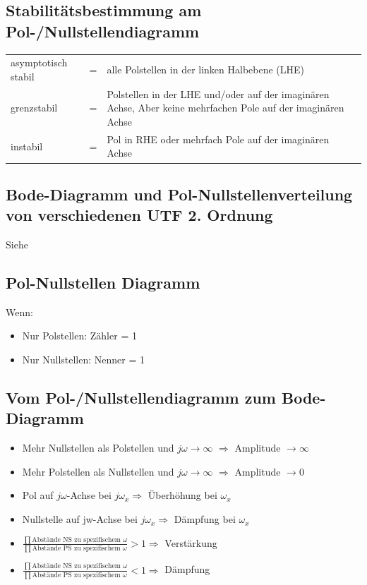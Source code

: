 \subsection{Stabilitätsbestimmung am Pol-/Nullstellendiagramm}
\begin{tabular}{lcp{13cm}}
	asymptotisch stabil & = & alle Polstellen in der linken Halbebene (LHE) \\
	grenzstabil & = & Polstellen in der LHE und/oder auf der imaginären 
  Achse, Aber keine mehrfachen Pole auf der imaginären Achse \\
  instabil & = & Pol in RHE oder mehrfach Pole auf der imaginären Achse
\end{tabular}

\subsection{Bode-Diagramm und Pol-Nullstellenverteilung von verschiedenen UTF
2. Ordnung}
Siehe   

\subsection{Pol-Nullstellen Diagramm}
Wenn:
\begin{itemize}
\item Nur Polstellen:  Zähler = 1
\item Nur Nullstellen: Nenner = 1
\end{itemize}

\subsection{Vom Pol-/Nullstellendiagramm zum Bode-Diagramm}
\begin{itemize}
  \item Mehr Nullstellen als Polstellen und $j \omega \rightarrow\infty$
  $\Longrightarrow$ Amplitude $\rightarrow\infty$
   \item Mehr Polstellen als Nullstellen und $j \omega \rightarrow\infty$
  $\Longrightarrow$ Amplitude $\rightarrow 0$
  \item Pol auf $j \omega$-Achse bei $j\omega_x \Longrightarrow$ Überhöhung bei
  $\omega_x$
  \item Nullstelle auf jw-Achse bei $j\omega_x \Longrightarrow$ Dämpfung bei $\omega_x$
  \item $\frac{\prod{\text{Abstände NS zu spezifischem
  $\omega$}}}{\prod{\text{Abstände PS zu spezifischem
  $\omega$}}} > 1 \Longrightarrow$ Verstärkung
  \item $\frac{\prod{\text{Abstände NS zu spezifischem
  $\omega$}}}{\prod{\text{Abstände PS zu spezifischem
  $\omega$}}} < 1 \Longrightarrow$ Dämpfung
  
\end{itemize}



